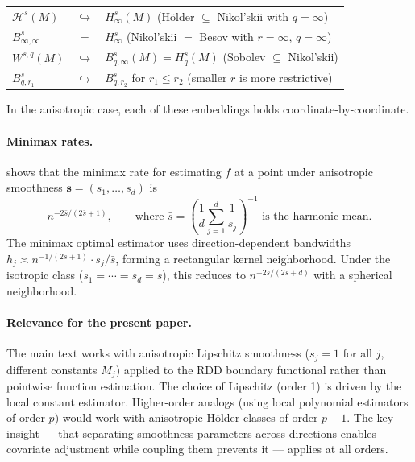 \begin{center}
\begin{tabular}{lcl}
	$\mathcal{H}^s(M)$ & $\hookrightarrow$ & $H_\infty^s(M)$ \quad (Hölder $\subseteq$ Nikol'skii with $q = \infty$) \\[3pt]
	$B_{\infty, \infty}^s$ & $=$ & $H_\infty^s$ \quad (Nikol'skii $=$ Besov with $r = \infty$, $q = \infty$) \\[3pt]
	$W^{s,q}(M)$ & $\hookrightarrow$ & $B_{q,\infty}^s(M) = H_q^s(M)$ \quad (Sobolev $\subseteq$ Nikol'skii) \\[3pt]
	$B_{q,r_1}^s$ & $\hookrightarrow$ & $B_{q,r_2}^s$ \quad for $r_1 \leq r_2$ \quad (smaller $r$ is more restrictive)
\end{tabular}
\end{center}

In the anisotropic case, each of these embeddings holds coordinate-by-coordinate.

\paragraph{Minimax rates.}
\textcite{stone_optimal_1980} shows that the minimax rate for estimating $f$ at a point under anisotropic smoothness $\mathbf{s} = (s_1, \ldots, s_d)$ is
\begin{equation}\label{eq:stone_rate}
	n^{-2\bar{s}/(2\bar{s}+1)}, \qquad \text{where } \bar{s} = \left(\frac{1}{d} \sum_{j=1}^d \frac{1}{s_j}\right)^{-1} \text{ is the harmonic mean.}
\end{equation}
The minimax optimal estimator uses direction-dependent bandwidths $h_j \asymp n^{-1/(2\bar{s}+1)} \cdot s_j / \bar{s}$, forming a rectangular kernel neighborhood.
Under the isotropic class ($s_1 = \cdots = s_d = s$), this reduces to $n^{-2s/(2s+d)}$ with a spherical neighborhood.

\paragraph{Relevance for the present paper.}
The main text works with anisotropic Lipschitz smoothness ($s_j = 1$ for all $j$, different constants $M_j$) applied to the RDD boundary functional rather than pointwise function estimation.
The choice of Lipschitz (order 1) is driven by the local constant estimator.
Higher-order analogs (using local polynomial estimators of order $p$) would work with anisotropic Hölder classes of order $p + 1$.
The key insight --- that separating smoothness parameters across directions enables covariate adjustment while coupling them prevents it --- applies at all orders.
